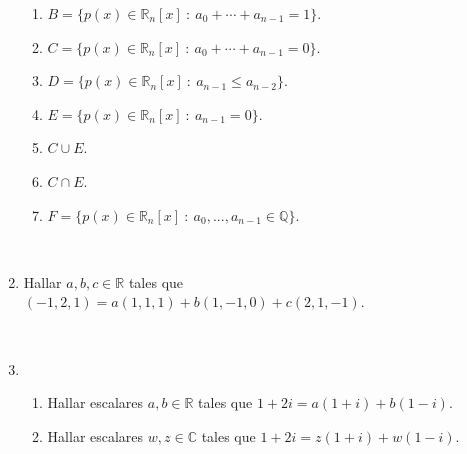 \documentclass[12pt]{amsart}
\begin{document}
\begin{enumerate}[resume]
\begin{enumerate}
     \item $B=\{p(x)\in\mathbb{R}_{n}[x] \ : \ a_0 + \cdots + a_{n-1} = 1\}$.
	 \item $C=\{p(x)\in\mathbb{R}_{n}[x] \ : \ a_0 + \cdots + a_{n-1} = 0\}$.
	 \item $D=\{p(x)\in\mathbb{R}_{n}[x] \ : \ a_{n-1} \le a_{n-2}\}$.
	 \item $E=\{p(x)\in\mathbb{R}_{n}[x] \ : \ a_{n-1}=0\}$.
	 \item $C\cup E$.
	 \item $C\cap E$.
	 \item $F=\{p(x)\in\mathbb{R}_{n}[x] \ : \  a_0, ..., a_{n-1}\in\mathbb{Q}\}$.
% 	
%
     \end{enumerate}

\

\item  Hallar $a, b, c\in \mathbb{R}$ tales que $(-1,2,1)=a(1,1,1)+b(1,-1,0)+c(2,1,-1)$.

\

\item
\begin{enumerate}
	\item Hallar escalares $a, b \in \mathbb R$ tales que $1+2i=a(1+i)+b(1-i)$.
	\item  Hallar escalares $w, z \in \mathbb C$ tales que $1+2i=z(1+i)+w(1-i)$.
\end{enumerate}
%


\end{enumerate}
\end{document}
